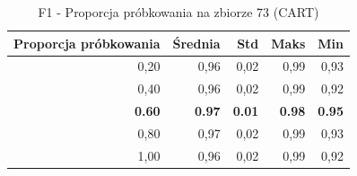 \begin{table}[htbp]
\centering
\small
\setlength{\tabcolsep}{6pt}
\renewcommand{\arraystretch}{1.2}
\caption{F1 - Proporcja próbkowania na zbiorze 73 (CART)}
\label{tab:CART_sample_ratio_73_f1}
\begin{tabular}{r|r|r|r|r}
\toprule
Proporcja próbkowania & Średnia & Std & Maks & Min \\
\hline
0,20 & 0,96 & 0,02 & 0,99 & 0,93 \\
0,40 & 0,96 & 0,02 & 0,99 & 0,92 \\
\textbf{0.60} & \textbf{0.97} & \textbf{0.01} & \textbf{0.98} & \textbf{0.95} \\
0,80 & 0,97 & 0,02 & 0,99 & 0,93 \\
1,00 & 0,96 & 0,02 & 0,99 & 0,92 \\
\bottomrule
\end{tabular}
\end{table}